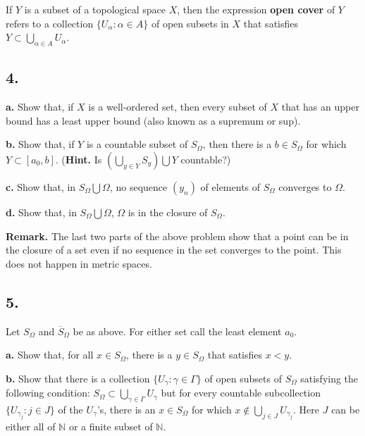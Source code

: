 \documentclass{amsart}
\theoremstyle{plain}
\theoremstyle{definition}
\theoremstyle{remark}
\begin{document}
If $Y$ is a subset of a topological space $X$, then the expression {\bf open cover} of $Y$ refers to a collection $\{ U_{\alpha} : \alpha \in A\}$ of open subsets in $X$ that satisfies $Y\subset \bigcup _{\alpha \in A} U_{\alpha}$. 

\vspace{.15in}
\noindent
\subsection*{4.}  

\vspace{.1in}
{\bfseries a.} Show that, if $X$ is a well-ordered set, then every subset of $X$ that has an upper bound has a least upper bound (also known as a supremum or sup).

\vspace{.1in}
{\bfseries b.}  Show that, if $Y$ is a countable subset of $S_{\Omega}$, then there is a $b \in S_{\Omega}$ for which $Y \subset [a_0 , b ]$. ({\bf Hint.} Is $(\bigcup _{y\in Y} S_y)\bigcup Y$ countable?) 

\vspace{.1in}
{\bfseries c.} Show that, in $S_{\Omega} \bigcup \Omega$, no sequence $(y_n)$ of elements of $S_{\Omega}$  converges to $\Omega$.

\vspace{.1in}
{\bfseries d.} Show that, in $S_{\Omega} \bigcup \Omega$, $\Omega$ is in the closure of $S_{\Omega}$. 

\vspace{.1in} {\bf Remark.} The last two parts of the above problem show that a point can be in the closure of a set even if no sequence in the set converges to the point. This does not happen in metric spaces. 



\vspace{.15in}
\noindent
\subsection*{5.} Let $S_{\Omega}$ and $\overline{S} _{\Omega}$ be as above. For either set call the least element $a_0$. 

\vspace{.1in}
{\bfseries a.} Show that, for all $x\in S_{\Omega}$, there is a $y\in S_{\Omega}$ that satisfies $x < y$.

\vspace{.1in}
{\bfseries b.}  Show that there is a collection $\{ U_{\gamma} : \gamma \in \Gamma \}$ of open subsets of $S_{\Omega}$ satisfying the following condition: $S_{\Omega} \subset \bigcup _{\gamma \in \Gamma} U_{\gamma}$ but for every countable subcollection $\{ U_{\gamma _j} : j\in J \} $ of the $U_{\gamma}$'s, there is an $x\in S_{\Omega}$ for which $x\notin \bigcup _{j\in J} U_{\gamma _j}$.  Here $J$ can be either all of $\mathbb N$ or a finite subset of $\mathbb N$. 
\end{document}
